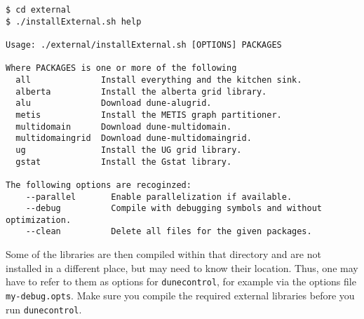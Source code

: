 \begin{lstlisting}[style=Bash]
$ cd external
$ ./installExternal.sh help

Usage: ./external/installExternal.sh [OPTIONS] PACKAGES

Where PACKAGES is one or more of the following
  all              Install everything and the kitchen sink.
  alberta          Install the alberta grid library.
  alu              Download dune-alugrid.
  metis            Install the METIS graph partitioner.
  multidomain      Download dune-multidomain.
  multidomaingrid  Download dune-multidomaingrid.
  ug               Install the UG grid library.
  gstat            Install the Gstat library.

The following options are recoginzed:
    --parallel       Enable parallelization if available.
    --debug          Compile with debugging symbols and without optimization.
    --clean          Delete all files for the given packages.
\end{lstlisting}

Some of the libraries are then compiled within that directory and are not installed in
a different place, but \Dune may need to know their location. Thus, one may have to refer to
them as options for \texttt{dunecontrol}, for example via the options file \texttt{my-debug.opts}.
Make sure you compile the required external libraries before you run \texttt{dunecontrol}.
